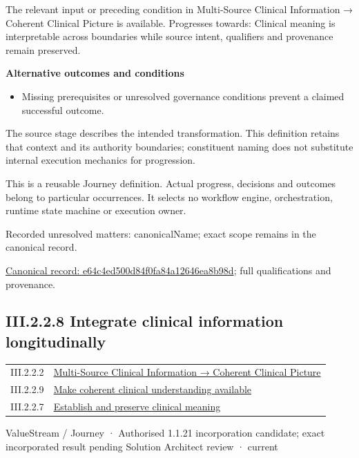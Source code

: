 The relevant input or preceding condition in Multi-Source Clinical Information → Coherent Clinical Picture is available. Progresses towards: Clinical meaning is interpretable across boundaries while source intent, qualifiers and provenance remain preserved.



\par\medskip\textbf{Alternative outcomes and conditions}\par


\begin{itemize}


\item Missing prerequisites or unresolved governance conditions prevent a claimed successful outcome.

\end{itemize}


The source stage describes the intended transformation. This definition retains that context and its authority boundaries; constituent naming does not substitute internal execution mechanics for progression.



This is a reusable Journey definition. Actual progress, decisions and outcomes belong to particular occurrences. It selects no workflow engine, orchestration, runtime state machine or execution owner.


{\small Recorded unresolved matters: canonicalName; exact scope remains in the canonical record.}\par
{\footnotesize \href{../../../../../../../continuum/strategy/value-stream/e64c4ed500d84f0fa84a12646ea8b98d.md}{Canonical record: e64c4ed500d84f0fa84a12646ea8b98d}; full qualifications and provenance.}\par
\subsection*{III.2.2.8 Integrate clinical information longitudinally}
\label{navigation:III.2.2.8}

\begin{longtable}{p{.22\linewidth}p{.73\linewidth}}
III.2.2.2 & \hyperref[element:01f655eae3d8485699449c3dcf4f9b56]{Multi-Source Clinical Information → Coherent Clinical Picture} \\
III.2.2.9 & \hyperref[element:75179fdde77f4c94a47756a7ae109b34]{Make coherent clinical understanding available} \\
III.2.2.7 & \hyperref[element:e64c4ed500d84f0fa84a12646ea8b98d]{Establish and preserve clinical meaning} \\
\end{longtable}
\label{element:80b2d41cb7fc4c929cee667353caa411}
{\small ValueStream / Journey · Authorised 1.1.21 incorporation candidate; exact incorporated result pending Solution Architect review · current}\par

